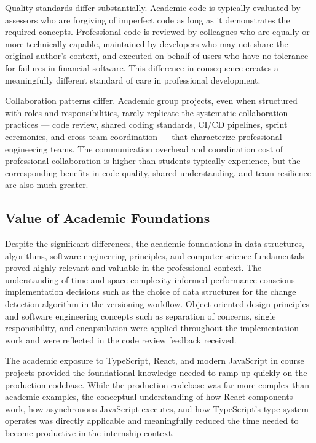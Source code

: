 Quality standards differ substantially. Academic code is typically evaluated by assessors who are forgiving of imperfect code as long as it demonstrates the required concepts. Professional code is reviewed by colleagues who are equally or more technically capable, maintained by developers who may not share the original author's context, and executed on behalf of users who have no tolerance for failures in financial software. This difference in consequence creates a meaningfully different standard of care in professional development.

Collaboration patterns differ. Academic group projects, even when structured with roles and responsibilities, rarely replicate the systematic collaboration practices — code review, shared coding standards, CI/CD pipelines, sprint ceremonies, and cross-team coordination — that characterize professional engineering teams. The communication overhead and coordination cost of professional collaboration is higher than students typically experience, but the corresponding benefits in code quality, shared understanding, and team resilience are also much greater.

\subsection{Value of Academic Foundations}

Despite the significant differences, the academic foundations in data structures, algorithms, software engineering principles, and computer science fundamentals proved highly relevant and valuable in the professional context. The understanding of time and space complexity informed performance-conscious implementation decisions such as the choice of data structures for the change detection algorithm in the versioning workflow. Object-oriented design principles and software engineering concepts such as separation of concerns, single responsibility, and encapsulation were applied throughout the implementation work and were reflected in the code review feedback received.

The academic exposure to TypeScript, React, and modern JavaScript in course projects provided the foundational knowledge needed to ramp up quickly on the production codebase. While the production codebase was far more complex than academic examples, the conceptual understanding of how React components work, how asynchronous JavaScript executes, and how TypeScript's type system operates was directly applicable and meaningfully reduced the time needed to become productive in the internship context.


